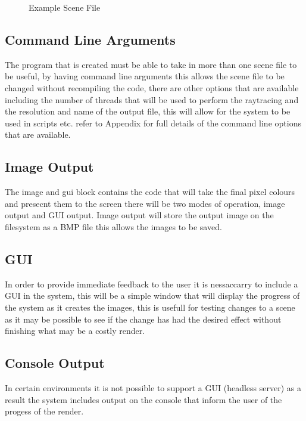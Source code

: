 \begin{figure}

\label{fig:scene_file_example}
\caption{Example Scene File}
\end{figure}

\subsection{Command Line Arguments}
The program that is created must be able to take in more than one scene file to be useful, by having command
line arguments this allows the scene file to be changed without recompiling the code, there are other options
that are available including the number of threads that will be used to perform the raytracing and the
resolution and name of the output file, this will allow for the system to be used in scripts etc. refer to
Appendix for full details of the command line options that are available.

\subsection{Image Output}
The image and gui block contains the code that will take the final pixel colours and presecnt them to the screen
there will be two modes of operation, image output and GUI output. Image output will store the output image
on the filesystem as a BMP file this allows the images to be saved.

\subsection{GUI}
In order to provide immediate feedback to the user it is nessaccarry to include a GUI in the system, this will
be a simple window that will display the progress of the system as it creates the images, this is usefull
for testing changes to a scene as it may be possible to see if the change has had the desired effect without
finishing what may be a costly render.

\subsection{Console Output}
In certain environments it is not possible to support a GUI (headless server) as a result the system includes
output on the console that inform the user of the progess of the render. 
